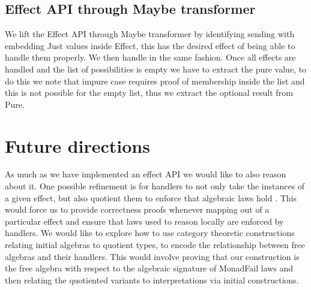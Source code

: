 \documentclass[10pt]{article}
\theoremstyle{definition}
\theoremstyle{remark}
\begin{document}
\subsection{Effect API through Maybe transformer}

We lift the Effect API through Maybe transformer by identifying
sending with embedding Just values inside Effect, this has the desired
effect of being able to handle them properly. We then handle in the
same fashion. Once all effects are handled and the list of
possibilities is empty we have to extract the pure value, to do this
we note that impure case requires proof of membership inside the list
and this is not possible for the empty list, thus we extract the optional result from
Pure.

\section{Future directions}
\label{sec:future-work}

As much as we have implemented an effect API we would like to also reason about it.
One possible refinement is for handlers to not only take the instances of a given effect, but also quotient them to enforce that algebraic laws hold \cite{algtheorieshit}. This would force us to provide correctness proofs whenever mapping out of a particular effect and ensure that laws used to reason locally are enforced by handlers.
We would like to explore how to use category theoretic constructions relating initial algebras to quotient types, to encode the relationship between free algebras and their handlers.
This would involve proving that our construction is the free algebra with respect to the algebraic signature of MonadFail laws and then relating the quotiented variants to interpretations via initial constructions.


\end{document}
